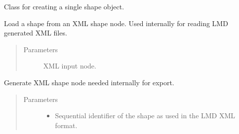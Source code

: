 \documentclass[letterpaper,10pt,english,openany,oneside]{sphinxmanual}
\begin{document}
\begin{fulllineitems}
\label{\detokenize{pages/modules:lmd.lib.Shape}}
\sphinxAtStartPar
Class for creating a single shape object.

\begin{fulllineitems}
\label{\detokenize{pages/modules:lmd.lib.Shape.from_xml}}
\sphinxAtStartPar
Load a shape from an XML shape node. Used internally for reading LMD generated XML files.
\begin{quote}\begin{description}
\item[{Parameters}] \leavevmode
\sphinxAtStartPar
{} \textendash{} XML input node.

\end{description}\end{quote}

\end{fulllineitems}


\begin{fulllineitems}
\label{\detokenize{pages/modules:lmd.lib.Shape.to_xml}}
\sphinxAtStartPar
Generate XML shape node needed internally for export.
\begin{quote}\begin{description}
\item[{Parameters}] \leavevmode\begin{itemize}
\item {} 
\sphinxAtStartPar
{} \textendash{} Sequential identifier of the shape as used in the LMD XML format.


\end{itemize}
\end{description}
\end{quote}
\end{fulllineitems}
\end{fulllineitems}
\end{document}

